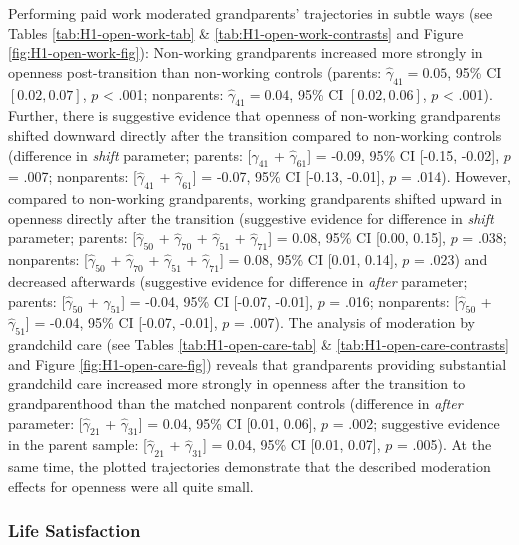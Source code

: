 \documentclass[
  english,
  man, noextraspace]{apa7}
\begin{document}
Performing paid work moderated grandparents' trajectories in subtle ways (see Tables \ref{tab:H1-open-work-tab} \& \ref{tab:H1-open-work-contrasts} and Figure \ref{fig:H1-open-work-fig}): Non-working grandparents increased more strongly in openness post-transition than non-working controls (parents: \(\hat{\gamma}_{41} = 0.05\), 95\% CI \([0.02, 0.07]\), \(p\) \textless{} .001; nonparents: \(\hat{\gamma}_{41} = 0.04\), 95\% CI \([0.02, 0.06]\), \(p\) \textless{} .001). Further, there is suggestive evidence that openness of non-working grandparents shifted downward directly after the transition compared to non-working controls (difference in \emph{shift} parameter; parents: {[}\(\hat{\gamma}_{41}\) + \(\hat{\gamma}_{61}\){]} = -0.09, 95\% CI {[}-0.15, -0.02{]}, \(p\) = .007; nonparents: {[}\(\hat{\gamma}_{41}\) + \(\hat{\gamma}_{61}\){]} = -0.07, 95\% CI {[}-0.13, -0.01{]}, \(p\) = .014). However, compared to non-working grandparents, working grandparents shifted upward in openness directly after the transition (suggestive evidence for difference in \emph{shift} parameter; parents: {[}\(\hat{\gamma}_{50}\) + \(\hat{\gamma}_{70}\) + \(\hat{\gamma}_{51}\) + \(\hat{\gamma}_{71}\){]} = 0.08, 95\% CI {[}0.00, 0.15{]}, \(p\) = .038; nonparents: {[}\(\hat{\gamma}_{50}\) + \(\hat{\gamma}_{70}\) + \(\hat{\gamma}_{51}\) + \(\hat{\gamma}_{71}\){]} = 0.08, 95\% CI {[}0.01, 0.14{]}, \(p\) = .023) and decreased afterwards (suggestive evidence for difference in \emph{after} parameter; parents: {[}\(\hat{\gamma}_{50}\) + \(\hat{\gamma}_{51}\){]} = -0.04, 95\% CI {[}-0.07, -0.01{]}, \(p\) = .016; nonparents: {[}\(\hat{\gamma}_{50}\) + \(\hat{\gamma}_{51}\){]} = -0.04, 95\% CI {[}-0.07, -0.01{]}, \(p\) = .007). The analysis of moderation by grandchild care (see Tables \ref{tab:H1-open-care-tab} \& \ref{tab:H1-open-care-contrasts} and Figure \ref{fig:H1-open-care-fig}) reveals that grandparents providing substantial grandchild care increased more strongly in openness after the transition to grandparenthood than the matched nonparent controls (difference in \emph{after} parameter: {[}\(\hat{\gamma}_{21}\) + \(\hat{\gamma}_{31}\){]} = 0.04, 95\% CI {[}0.01, 0.06{]}, \(p\) = .002; suggestive evidence in the parent sample: {[}\(\hat{\gamma}_{21}\) + \(\hat{\gamma}_{31}\){]} = 0.04, 95\% CI {[}0.01, 0.07{]}, \(p\) = .005). At the same time, the plotted trajectories demonstrate that the described moderation effects for openness were all quite small.

\hypertarget{life-satisfaction-1}{%
\subsubsection{Life Satisfaction}\label{life-satisfaction-1}}
\end{document}

